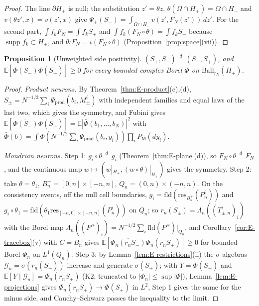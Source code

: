 \documentclass[11pt]{article}
\theoremstyle{plain}
\newtheorem{proposition}[theorem]{Proposition}
\theoremstyle{definition}
\theoremstyle{remark}
\newcommand{\E}{\mathbb{E}}
\newcommand{\cG}{\mathcal{G}}
\newcommand{\fld}{\mathrm{fld}}
\newcommand{\resB}{\mathrm{res}}
\newcommand{\Ball}{\mathrm{Ball}}
\newcommand{\conj}[1]{\overline{#1}}
\DeclareMathOperator{\supp}{supp}
\begin{document}
\begin{proof}
The line $\partial H_+$ is null; the substitution $z'=\theta z$, $\theta(\Omega\cap H_+)=\Omega\cap H_-$ and
$v(\theta z',x)=v(z',x)$ give $\Psi_+(S_-)=\int_{\Omega\cap H_-}v(z',F_N(z'))\,dz'$. For the second part,
$\int f_kF_N=\int f_kS_+$ and $\int f_k(F_N\circ\theta)=\int f_kS_-$ because $\supp f_k\subset H_+$, and
$\theta\iota F_N=\iota(F_N\circ\theta)$ (Proposition~\ref{prop:space}(vii)).
\end{proof}

\begin{proposition}[Unweighted side positivity]\label{prop:E-sides}
$(S_+,S_-)\overset{d}{=}(S_-,S_+)$, and $\E[\conj{\Phi(S_-)}\Phi(S_+)]\ge0$ for every bounded complex
Borel $\Phi$ on $\Ball_{r_N}(H_+)$.
\end{proposition}

\begin{proof}
\emph{Product neurons.} By Theorem~\ref{thm:E-product}(c),(d),
$S_\pm=N^{-1/2}\sum_i\Psi_{\mathrm{prod}}(b_i,M^{i}_{\pm})$ with independent families and equal laws of the
last two, which gives the symmetry, and Fubini gives
$\E[\conj{\Phi(S_-)}\Phi(S_+)]=\E|\bar\Phi(b_1,\dots,b_N)|^{2}$ with
$\bar\Phi(b)=\int\Phi(N^{-1/2}\sum_i\Psi_{\mathrm{prod}}(b_i,y_i))\prod_iP_{\mathsf M}(dy_i)$.

\emph{Mondrian neurons.} Step 1: $g_i\circ\theta\overset{d}{=}g_i$ (Theorem~\ref{thm:E-plane}(d)), so
$F_N\circ\theta\overset{d}{=}F_N$, and the continuous map $w\mapsto(w|_{H_+},(w\circ\theta)|_{H_+})$ gives the
symmetry. Step 2: take $\theta=\theta_1$, $B^{+}_{n}=[0,n]\times[-n,n]$, $Q_n=(0,n)\times(-n,n)$. On the
consistency events, off the null cell boundaries, $g_i=\fld(\resB_{B^{+}_{n}}(P^{i}_{n}))$ and
$g_i\circ\theta_1=\fld(\theta_1\resB_{[-n,0]\times[-n,n]}(P^{i}_{n}))$ on $Q_n$; so $r_n(S_\pm)=\Lambda_n((T^{i}_{\pm,n})_i)$ with
the Borel map $\Lambda_n((P'^{i})_i)=N^{-1/2}\sum_i\fld(P'^{i})|_{Q_n}$, and
Corollary~\ref{cor:E-tracebox}(v) with $C=B_n$ gives
$\E[\conj{\Phi_n(r_nS_-)}\Phi_n(r_nS_+)]\ge0$ for bounded Borel $\Phi_n$ on $L^{1}(Q_n)$. Step 3: by
Lemma~\ref{lem:E-restrictions}(ii) the $\sigma$-algebras $\cG_n=\sigma(r_n(S_+))$ increase and generate
$\sigma(S_+)$; with $Y=\Phi(S_+)$ and $\E[Y\mid\cG_n]=\Phi_n(r_nS_+)$ (K2; truncated to $|\Phi_n|\le\sup|\Phi|$),
Lemma~\ref{lem:E-projections} gives $\Phi_n(r_nS_+)\to\Phi(S_+)$ in $L^{2}$, Step 1 gives the same for
the minus side, and Cauchy--Schwarz passes the inequality to the limit.
\end{proof}
\end{document}
